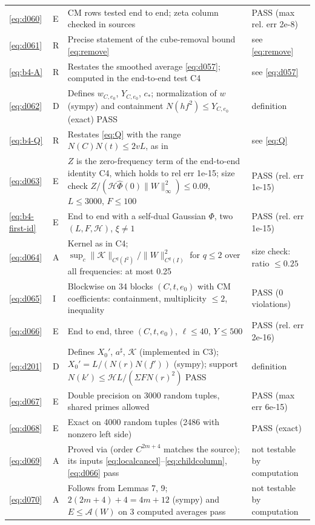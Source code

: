 \documentclass[11pt]{article}
\numberwithin{equation}{section}
\begin{document}
\begin{longtable}{@{}>{\raggedright\arraybackslash}p{1.2cm}>{\centering\arraybackslash}p{0.7cm}>{\raggedright\arraybackslash}p{9.05cm}>{\raggedright\arraybackslash}p{4.3cm}@{}}
\eqref{eq:d060} & E & CM rows tested end to end; zeta column checked in sources & PASS (max rel. err 2e-8)\\
\eqref{eq:d061} & R & Precise statement of the cube-removal bound \eqref{eq:remove} & see \eqref{eq:remove}\\
\eqref{eq:b4-A} & R & Restates the smoothed average \eqref{eq:d057}; computed in the end-to-end test C4 & see \eqref{eq:d057}\\
\eqref{eq:d062} & D & Defines $w_{C,e_0}$, $Y_{C,e_0}$, $c_*$; normalization of $w$ (sympy) and containment $N(hf^2)\le Y_{C,e_0}$ (exact) PASS & definition\\
\eqref{eq:b4-Q} & R & Restates \eqref{eq:Q} with the range $N(C)N(t)\le2vL$, as in~\cite{OAI1112} & see \eqref{eq:Q}\\
\eqref{eq:d063} & E & $Z$ is the zero-frequency term of the end-to-end identity C4, which holds to rel err 1e-15; size check $Z/(\mathcal H\widehat\Phi(0)\|W\|_\infty^2)\le0.09$, $L\le3000$, $F\le100$ & PASS (rel. err 1e-15)\\
\eqref{eq:b4-first-id} & E & End to end with a self-dual Gaussian $\Phi$, two $(L,F,\mathcal H)$, $\xi\ne1$ & PASS (rel. err 1e-15)\\
\eqref{eq:d064} & A & Kernel as in C4; $\sup_c\|\mathcal K\|_{C^q(I^2)}/\|W\|_{C^q(I)}^2$ for $q\le2$ over all frequencies: at most 0.25 & size check: ratio $\le0.25$\\
\eqref{eq:d065} & I & Blockwise on 34 blocks $(C,t,e_0)$ with CM coefficients: containment, multiplicity $\le2$, inequality & PASS (0 violations)\\
\eqref{eq:d066} & E & End to end, three $(C,t,e_0)$, $\ell\le40$, $Y\le500$ & PASS (rel. err 2e-16)\\
\eqref{eq:d201} & D & Defines $X_0'$, $a^\sharp$, $\mathcal K$ (implemented in C3); $X_0'=L/(N(r)N(f'))$ (sympy); support $N(k')\le\mathcal HL/(\Sigma FN(r)^2)$ PASS & definition\\
\eqref{eq:d067} & E & Double precision on 3000 random tuples, shared primes allowed & PASS (max err 6e-15)\\
\eqref{eq:d068} & E & Exact on 4000 random tuples (2486 with nonzero left side) & PASS (exact)\\
\eqref{eq:d069} & A & Proved via \cite[Lemma~7.3]{OAI1112} (order $C^{2m+4}$ matches the source); its inputs \eqref{eq:localcancel}--\eqref{eq:childcolumn}, \eqref{eq:d066} pass & not testable by computation\\
\eqref{eq:d070} & A & Follows from Lemmas 7, 9; $2(2m+4)+4=4m+12$ (sympy) and $E\le\mathcal A(W)$ on 3 computed averages pass & not testable by computation\\

\end{longtable}
\end{document}
